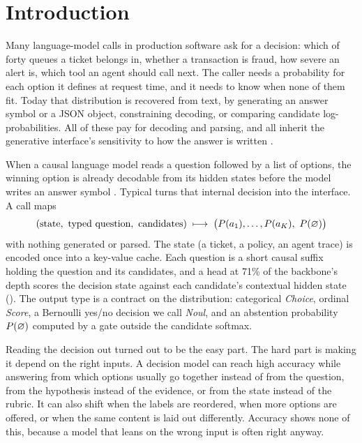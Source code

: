 \section{Introduction}
\label{sec:intro}

Many language-model calls in production software ask for a decision: which of forty queues a ticket
belongs in, whether a transaction is fraud, how severe an alert is, which tool an agent should call
next. The caller needs a probability for each option it defines at request time, and it needs to know
when none of them fit. Today that distribution is recovered from text, by generating an answer symbol or
a JSON object, constraining decoding, or comparing candidate log-probabilities. All of these pay for
decoding and parsing, and all inherit the generative interface's sensitivity to how the answer is
written \citep{zheng2024selectionbias,pezeshkpour2024optionorder,wang2024firsttoken}.

When a causal language model reads a question followed by a list of options, the winning option is
already decodable from its hidden states before the model writes an answer symbol \citep{wong2026models}.
Typical turns that internal decision into the interface. A call maps
\[
  (\text{state},\ \text{typed question},\ \text{candidates}) \;\longmapsto\;
  \big(P(\cand{1}),\dots,P(\cand{\numcands}),\ \pnull\big)
\]
with nothing generated or parsed. The state (a ticket, a policy, an agent trace) is encoded once into a
key-value cache. Each question is a short causal suffix holding the question and its candidates, and a
head at 71\% of the backbone's depth scores the decision state against each candidate's contextual
hidden state (). The output type is a contract on the distribution: categorical
\emph{Choice}, ordinal \emph{Score}, a Bernoulli yes/no decision we call \emph{Noul}, and an abstention
probability $P(\varnothing)$ computed by a gate outside the candidate softmax.

Reading the decision out turned out to be the easy part. The hard part is making it depend on the right
inputs. A decision model can reach high accuracy while answering from which options usually go
together instead of from the question, from the hypothesis instead of the evidence, or from the state
instead of the rubric. It can also shift when the labels are reordered, when more options are offered,
or when the same content is laid out differently. Accuracy shows none of this, because a model that
leans on the wrong input is often right anyway.

